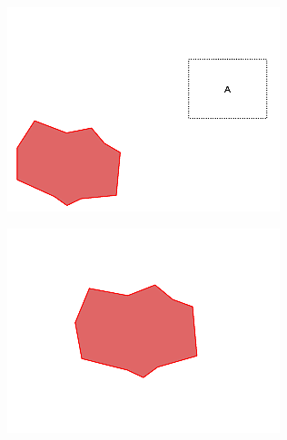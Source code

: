 \begin{minipage}{\linewidth}
	\centering
	\begin{minipage}{0.42\linewidth}
		\includegraphics[width=\linewidth]{../ui_experiment/slide_images/Swarm_Robot_Control_-_Unknown_Number_of_Robots_0033.png}
		\label{fig:sub2}
	\end{minipage}
	\begin{minipage}{0.42\linewidth}
		\includegraphics[width=\linewidth]{../ui_experiment/slide_images/Swarm_Robot_Control_-_Unknown_Number_of_Robots_0035.png}
		\label{fig:sub1}
	\end{minipage}
\end{minipage}